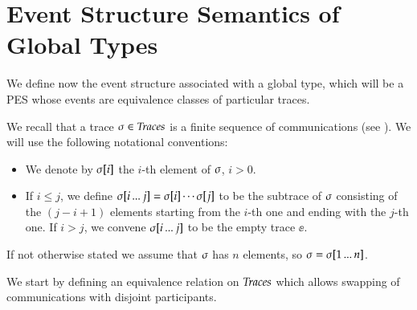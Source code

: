 
\section{Event Structure Semantics of Global Types}

 We define now the event structure associated with a global type, 
 which will be a PES whose events
are equivalence classes of particular traces. 


 We recall that a trace $\sigma \in \textit{Traces}$ is a finite sequence of 
communications (see ). 
We will use the following notational conventions:

\begin{itemize}
\item We denote by 
  $\sigma[i]$ the $i$-th
  element of  $\sigma$,  $i > 0$. 
\item If $i \leq j$, we define $\sigma[i\,...\,j] =
  \sigma[i] \cdots \sigma[j]$ to be the subtrace of
  $\sigma$ consisting of the $(j-i+1)$ elements starting from the
  $i$-th one and ending with the $j$-th one.  If $i > j$, we convene
  $\sigma[i\,...\,j]$ to be the empty trace $\ee$.
\end{itemize}
If not otherwise stated we assume that $\sigma$ has $n$
elements, so $\sigma=\sigma[1\,...\,n]$. 

\bigskip

We start by defining an equivalence relation on $\textit{Traces}$ which allows
swapping of communications with disjoint participants.


